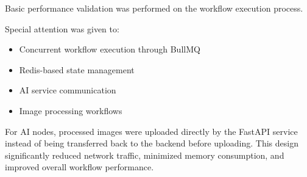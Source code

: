 Basic performance validation was performed on the workflow execution process.

Special attention was given to:

\begin{itemize}
    \item Concurrent workflow execution through BullMQ
    \item Redis-based state management
    \item AI service communication
    \item Image processing workflows
\end{itemize}

For AI nodes, processed images were uploaded directly by the FastAPI service instead of being transferred back to the backend before uploading. This design significantly reduced network traffic, minimized memory consumption, and improved overall workflow performance.